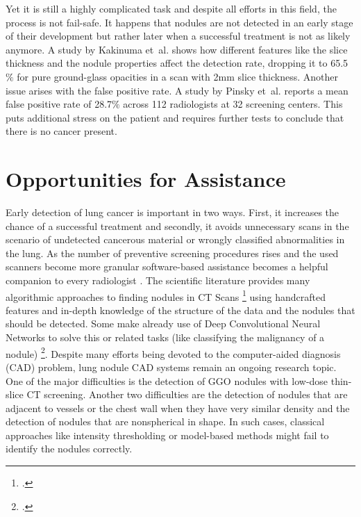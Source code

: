 \documentclass[main.tex]{subfiles}
\begin{document}
Yet it is still a highly complicated task and despite all efforts in this field, the process is not fail-safe. It happens that nodules are not detected in an early stage of their development but rather later when a successful treatment is not as likely anymore. A study by Kakinuma et~al.\cite{kakinuma2012comparison} shows how different features like the slice thickness and the nodule properties affect the detection rate, dropping it to 65.5$\%$ for pure ground-glass opacities in a scan with 2mm slice thickness. Another issue arises with the false positive rate. A study by Pinsky et~al.\cite{pinsky2013national} reports a mean false positive rate of 28.7$\%$ across 112 radiologists at 32 screening centers. This puts additional stress on the patient and requires further tests to conclude that there is no cancer present.


\section{Opportunities for Assistance}

Early detection of lung cancer is important in two ways. First, it increases the chance of a successful treatment and secondly, it avoids unnecessary scans in the scenario of undetected cancerous material or wrongly classified abnormalities in the lung. As the number of preventive screening procedures rises and the used scanners become more granular software-based assistance becomes a helpful companion to every radiologist \cite{li2005computer}. The scientific literature provides many algorithmic approaches to finding nodules in CT Scans \footcite{armato1999computerized,armato2001automated,okada2005robust,tao2009multi,
ye2009shape} using handcrafted features and in-depth knowledge of the structure of the data and the nodules that should be detected. Some make already use of Deep Convolutional Neural Networks to solve this or related tasks (like classifying the malignancy of a nodule) \footcite{cheng2016computer,huang2017lung,shen2015multi}. Despite many efforts being devoted to the computer-aided diagnosis (CAD) problem, lung nodule CAD systems remain an ongoing research topic. One of the major difficulties is the detection of GGO nodules with low-dose thin-slice CT screening. Another two difficulties are the detection of nodules that are adjacent to vessels or the chest wall when they have very similar density and the detection of nodules that are nonspherical in shape. In such cases, classical approaches like intensity thresholding or model-based methods might fail to identify the nodules correctly.
\end{document}
